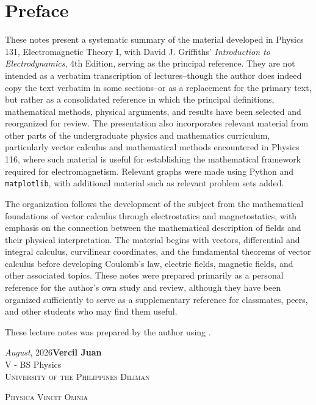 \section*{Preface}
\vspace{0.5cm}

\hspace{2em}These notes present a systematic summary of the material developed in Physics 131, 
Electromagnetic Theory I, with David J. Griffiths' \textit{Introduction to Electrodynamics}, 
4th Edition, serving as the principal reference. They are not intended as a verbatim transcription
of lectures--though the author does indeed copy the text verbatim in some sections--or as a replacement
for the primary text, but rather as a consolidated reference in which the principal definitions, mathematical 
methods, physical arguments, and results have been selected and reorganized for review. The presentation
also incorporates relevant material from other parts of the undergraduate physics and mathematics curriculum,
particularly vector calculus and mathematical methods encountered in Physics 116, where such material is useful
for establishing the mathematical framework required for electromagnetism. Relevant graphs were made using Python and \texttt{matplotlib},
with additional material such as relevant problem sets added.

The organization follows the development of the subject from the mathematical foundations of vector calculus
through electrostatics and magnetostatics, with emphasis on the connection between the mathematical description 
of fields and their physical interpretation. The material begins with vectors, differential and integral calculus,
curvilinear coordinates, and the fundamental theorems of vector calculus before developing Coulomb's law, electric
fields, magnetic fields, and other associated topics. These notes were prepared 
primarily as a personal reference for the author's own study and review, although they have been 
organized sufficiently to serve as a supplementary reference for classmates, peers, and other 
students who may find them useful. 

These lecture notes was prepared by the author using \LaTeXe.


\begin{flushright}
	\textit{August}, 2026\hfill\textbf{Vercil Juan}\\
	\textrm{V - BS Physics}\\
	\textsc{University of the Philippines Diliman}
\end{flushright}

\vfill
\begin{center}
{\large\textsc{Physica Vincit Omnia}}
\end{center}
